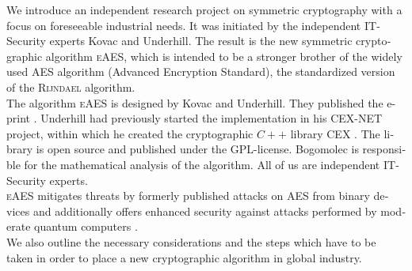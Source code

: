 \documentclass[a4paper,11pt]{article}
\begin{document}
\begin{otherlanguage}{english}

\vspace{3mm}
\begin{multicols}{2}
\noindent



\vspace{0.1cm}

\noindent
We introduce an independent research project on symmetric cryptography with a focus on foreseeable industrial needs. It was initiated by the independent IT-Security experts Kovac and Underhill. The result is the new symmetric cryptographic algorithm \textsc{eAES}, which is intended to be a stronger brother of the widely used \textsc{AES} algorithm (Advanced Encryption Standard), the standardized version of the \textsc{Rijndael} algorithm. \\

\noindent
The algorithm \textsc{eAES} is designed by Kovac and Underhill. They published the e-print \cite{KUN}. Underhill had previously started the implementation in his CEX-NET project, within which he created the cryptographic $C++$ library CEX \cite{CEX}. The library is open source and published under the GPL-license. Bogomolec is responsible for the mathematical analysis of the algorithm. All of us are independent IT-Security experts.\\

\noindent
\textsc{eAES} mitigates threats by formerly published attacks on \textsc{AES} from binary devices \cite{HFE,WEI,CRK} and additionally offers enhanced security against attacks performed by moderate quantum computers \cite{GRO,QAA}. \\

\noindent
We also outline the necessary considerations and the steps which have to be taken in order to place a new cryptographic algorithm in global industry.\\


\end{multicols}
\end{otherlanguage}
\end{document}
